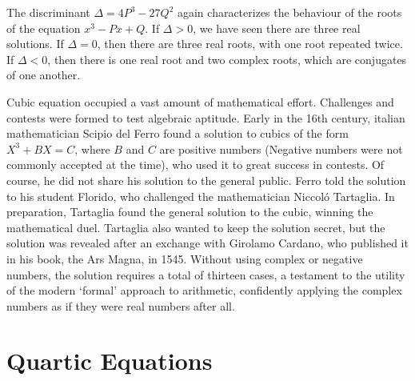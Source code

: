 \begin{remark}
	The discriminant $\Delta = 4P^3 - 27Q^2$ again characterizes the behaviour of the roots of the equation $x^3 - Px + Q$. If $\Delta > 0$, we have seen there are three real solutions. If $\Delta = 0$, then there are three real roots, with one root repeated twice. If $\Delta < 0$, then there is one real root and two complex roots, which are conjugates of one another.
\end{remark}

Cubic equation occupied a vast amount of mathematical effort. Challenges and contests were formed to test algebraic aptitude. Early in the 16th century, italian mathematician Scipio del Ferro found a solution to cubics of the form $X^3 + BX = C$, where $B$ and $C$ are positive numbers (Negative numbers were not commonly accepted at the time), who used it to great success in contests. Of course, he did not share his solution to the general public. Ferro told the solution to his student Florido, who challenged the mathematician Niccol\'{o} Tartaglia. In preparation, Tartaglia found the general solution to the cubic, winning the mathematical duel. Tartaglia also wanted to keep the solution secret, but the solution was revealed after an exchange with Girolamo Cardano, who published it in his book, the Ars Magna, in 1545. Without using complex or negative numbers, the solution requires a total of thirteen cases, a testament to the utility of the modern `formal' approach to arithmetic, confidently applying the complex numbers as if they were real numbers after all.

\section{Quartic Equations}

